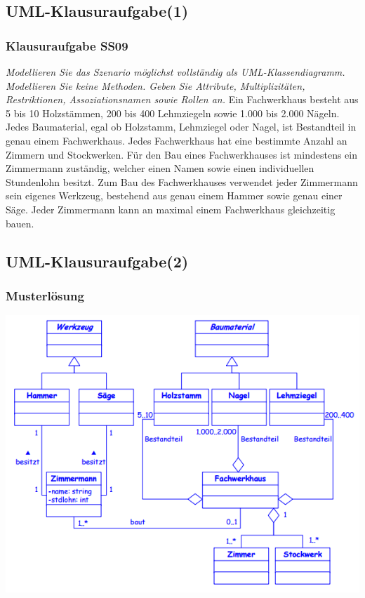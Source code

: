 \documentclass[18pt]{beamer}
\begin{document}
	\subsection{UML-Klausuraufgabe(1)}
	\begin{frame}
		\frametitle{Klausuraufgabe SS09}
		\textit{Modellieren Sie das Szenario möglichst vollständig als UML-Klassendiagramm. Modellieren Sie keine Methoden. Geben Sie Attribute, Multiplizitäten, Restriktionen, Assoziationsnamen sowie Rollen an.} \linebreak
		Ein Fachwerkhaus besteht aus 5 bis 10 Holzstämmen, 200 bis 400 Lehmziegeln sowie 1.000 bis 2.000 Nägeln. Jedes Baumaterial, egal ob Holzstamm, Lehmziegel oder Nagel, ist Bestandteil in genau einem Fachwerkhaus. Jedes Fachwerkhaus hat eine bestimmte Anzahl an Zimmern und Stockwerken. Für den Bau eines Fachwerkhauses ist mindestens ein Zimmermann zuständig, welcher einen Namen sowie einen individuellen Stundenlohn besitzt. Zum Bau des Fachwerkhauses verwendet jeder Zimmermann sein eigenes Werkzeug, bestehend aus genau einem Hammer sowie genau einer Säge. Jeder Zimmermann kann an maximal einem Fachwerkhaus gleichzeitig bauen. 
	\end{frame}
	
	\subsection{UML-Klausuraufgabe(2)}
	\begin{frame}
		\frametitle{Musterlösung}
		\includegraphics[scale=0.48]{./pics/tut1/solution.png}
	\end{frame}
		
\end{document}
